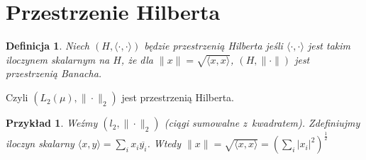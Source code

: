 \documentclass[11pt]{mwrep}
\renewcommand{\[}{\begin{equation}}
\renewcommand{\]}{\end{equation}}
\newcommand{\norm}{\|\cdot\|}
\newtheorem{de}[subsection]{Definicja}
\newtheorem{ex}[subsection]{Przykład}
\begin{document}
\section{Przestrzenie Hilberta}
\begin{de}
	Niech $(H,\langle \cdot,\cdot \rangle)$ będzie przestrzenią Hilberta jeśli $\langle \cdot,\cdot \rangle$ jest takim iloczynem skalarnym na $H$, że dla 
	$\|x\| = \sqrt{\langle x,x \rangle}$, $(H,\norm)$ jest przestrzenią Banacha. 
\end{de}
Czyli $(L_2(\mu),\|\cdot\|_2)$ jest przestrzenią Hilberta.
\begin{ex}
	Weźmy $(l_2,\norm_2)$ (ciągi sumowalne z~kwadratem). Zdefiniujmy iloczyn skalarny $\langle x,y \rangle = \sum_{i}^{}x_i \overline{y_i}$.
	Wtedy $\|x\| = \sqrt{\langle x,x \rangle} = \left( \sum_{i}^{}|x_i|^2 \right)^\frac{1}{2}$
\end{ex}
\end{document}
